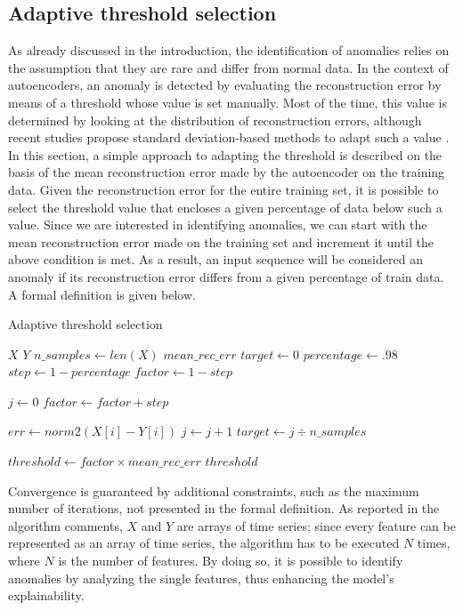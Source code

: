 \documentclass{article}
\begin{document}
\begin{multicols*}{2}
\section{Adaptive threshold selection}
As already discussed in the introduction, the identification of anomalies relies on the assumption that they are rare and differ from normal data. In the context of autoencoders, an anomaly is detected by evaluating the reconstruction error by means of a threshold whose value is set manually. Most of the time, this value is determined by looking at the distribution of reconstruction errors, although recent studies propose standard deviation-based methods to adapt such a value \cite{adaptivethresh}.
In this section, a simple approach to adapting the threshold is described on the basis of the mean reconstruction error made by the autoencoder on the training data. Given the reconstruction error for the entire training set, it is possible to select the threshold value that encloses a given percentage of data below such a value. Since we are interested in identifying anomalies, we can start with the mean reconstruction error made on the training set and increment it until the above condition is met. As a result, an input sequence will be considered an anomaly if its reconstruction error differs from a given percentage of train data.
A formal definition is given below.

\begin{algorithm}[H]
\caption{Adaptive threshold selection}
\begin{algorithmic}
	\label{threshold}
	\STATE $X$ 
	\STATE $Y$ 
	\STATE $n\_samples \gets len(X)$ 
	\STATE $mean\_rec\_err $ 
	\STATE $target \gets 0$
	\STATE $percentage \gets .98$
	\STATE $step \gets 1 - percentage$
	\STATE $factor \gets 1 - step$
	
			\STATE $j \gets 0$
				\STATE $factor \gets factor + step$
				
					\STATE $err \gets norm2(X[i] - Y[i])$
					\STATE $j \gets j+1$
					\ENDIF
				\ENDFOR
			\STATE$target \gets j \div n\_samples$
	\ENDWHILE\
	
	\STATE $threshold \gets factor \times mean\_rec\_err$
	\RETURN $threshold$
\end{algorithmic}
\end{algorithm}
Convergence is guaranteed by additional constraints, such as the maximum number of iterations, not presented in the formal definition.
As reported in the algorithm comments, $X$ and $Y$ are arrays of time series; since every feature can be represented as an array of time series, the algorithm has to be executed $N$ times, where $N$ is the number of features. By doing so, it is possible to identify anomalies by analyzing the single features, thus enhancing the model's explainability.


\end{multicols*}
\end{document}

